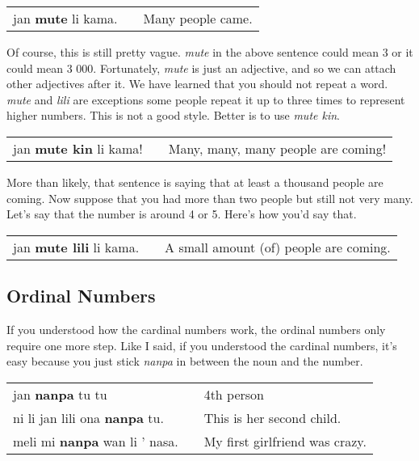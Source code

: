 \begin{supertabular}{p{5,5cm}|ll}
jan \textbf{mute} li kama. && Many people came. \\
\end{supertabular} 

Of course, this is still pretty vague. 
\textit{mute} in the above sentence could mean 3 or it could mean 3 000. 
Fortunately, \textit{mute} is just an adjective, and so we can attach other adjectives after it. 
We have learned that you should not repeat a word. \textit{mute} and \textit{lili} are exceptions some people repeat it up to three times to represent higher numbers. 
This is not a good style. 
Better is to use \textit{mute kin}. 

\begin{supertabular}{p{5,5cm}|ll}
jan \textbf{mute kin} li kama! && Many, many, many people are coming! \\
\end{supertabular} 

More than likely, that sentence is saying that at least a thousand people are coming.  
Now suppose that you had more than two people but still not very many. 
Let's say that the number is around 4 or 5. Here's how you'd say that. 

\begin{supertabular}{p{5,5cm}|ll}
jan \textbf{mute lili} li kama. && A small amount (of) people are coming. \\
\end{supertabular} 
%
\subsection*{Ordinal Numbers}
%
If you understood how the cardinal numbers work, the ordinal numbers only require one more step. 
Like I said, if you understood the cardinal numbers, it's easy because you just stick \textit{nanpa} in between the noun and the number. 

\begin{supertabular}{p{5,5cm}|ll}
jan \textbf{nanpa} tu tu && 4th person \\
ni li jan lili ona \textbf{nanpa} tu. && This is her second child. \\
meli mi \textbf{nanpa} wan li ' nasa. && My first girlfriend was crazy. \\
\end{supertabular} 
%
